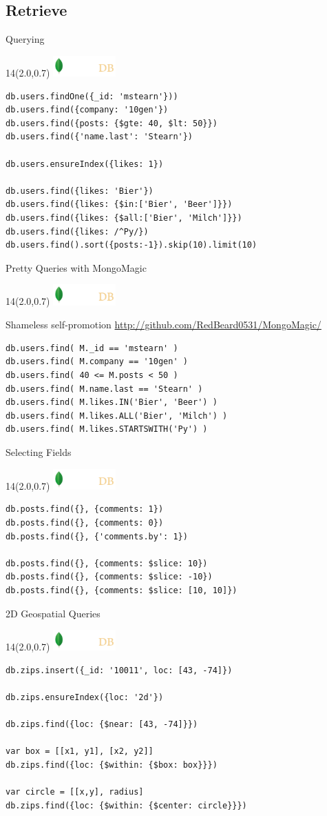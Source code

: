 \documentclass{beamer}
\newcommand{\MongoLogo}{
\begin{textblock}{14}(2.0,0.7)
  \includegraphics[height=0.8cm]{logo-mongodb-ondark.png}
\end{textblock}
}
\begin{document}
\subsection{Retrieve}
\begin{frame}[fragile]{Querying}
  \MongoLogo

  \begin{lstlisting}
db.users.findOne({_id: 'mstearn'}))
db.users.find({company: '10gen'})
db.users.find({posts: {$gte: 40, $lt: 50}}) 
db.users.find({'name.last': 'Stearn'})

db.users.ensureIndex({likes: 1})

db.users.find({likes: 'Bier'})
db.users.find({likes: {$in:['Bier', 'Beer']}})
db.users.find({likes: {$all:['Bier', 'Milch']}})
db.users.find({likes: /^Py/})
db.users.find().sort({posts:-1}).skip(10).limit(10)
  \end{lstlisting}
\end{frame}

\begin{frame}[fragile]{Pretty Queries with MongoMagic}
  \MongoLogo

  \begin{block}{Shameless self-promotion}
    \url{http://github.com/RedBeard0531/MongoMagic/}
  \end{block}

  \begin{lstlisting}
db.users.find( M._id == 'mstearn' )
db.users.find( M.company == '10gen' )
db.users.find( 40 <= M.posts < 50 ) 
db.users.find( M.name.last == 'Stearn' )
db.users.find( M.likes.IN('Bier', 'Beer') )
db.users.find( M.likes.ALL('Bier', 'Milch') )
db.users.find( M.likes.STARTSWITH('Py') )
  \end{lstlisting}
\end{frame}

\begin{frame}[fragile]{Selecting Fields}
  \MongoLogo

  \begin{lstlisting}
db.posts.find({}, {comments: 1})
db.posts.find({}, {comments: 0})
db.posts.find({}, {'comments.by': 1})

db.posts.find({}, {comments: $slice: 10})
db.posts.find({}, {comments: $slice: -10})
db.posts.find({}, {comments: $slice: [10, 10]})
  \end{lstlisting}
\end{frame}

\begin{frame}[fragile]{2D Geospatial Queries}
  \MongoLogo

  \small
  \begin{lstlisting}
db.zips.insert({_id: '10011', loc: [43, -74]})

db.zips.ensureIndex({loc: '2d'})

db.zips.find({loc: {$near: [43, -74]}})

var box = [[x1, y1], [x2, y2]]
db.zips.find({loc: {$within: {$box: box}}})

var circle = [[x,y], radius]
db.zips.find({loc: {$within: {$center: circle}}})
                 
  \end{lstlisting}
\end{frame}
\end{document}
